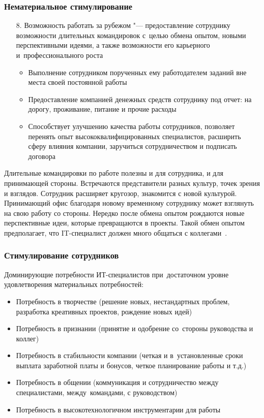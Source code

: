 \documentclass{../industrial-development}
\begin{document}
\begin{frame} \frametitle{Нематериальное стимулирование}
				  \begin{itemize}
					\item[8.] \alert{Возможность работать за рубежом} "--- предоставление сотруднику возможности длительных командировок с~целью обмена опытом, новыми перспективными идеями, а также возможности его карьерного и~профессионального роста
					
									  \begin{itemize}
          \item Выполнение сотрудником порученных ему работодателем заданий вне места своей постоянной работы 
          \item Предоставление компанией денежных средств сотруднику под отчет: на дорогу, проживание, питание и прочие расходы
					\item Способствует улучшению качества работы сотрудников, позволяет перенять опыт высококвалифицированных специалистов, расширить сферу влияния компании, заручиться сотрудничеством и подписать договора

  \end{itemize}
  \end{itemize}
		\end{frame}
		
		\lecturenotes
		
Длительные командировки по работе полезны и для сотрудника, и для принимающей стороны. Встречаются представители разных культур, точек зрения и взглядов. Сотрудник расширяет кругозор, знакомится с новой культурой. Принимающий офис благодаря новому временному сотруднику может взглянуть на свою работу со стороны. Нередко после обмена опытом рождаются новые перспективные идеи, которые превращаются в проекты. Такой обмен опытом предполагает, что IT-специалист должен много общаться с коллегами~\cite{VchemosobenIT}.

\begin{frame} \frametitle{Стимулирование сотрудников}
				  Доминирующие потребности ИТ-специалистов при~достаточном уровне удовлетворения материальных потребностей:
					\begin{itemize}
					
\item Потребность в творчестве (решение новых, нестандартных проблем, разработка креативных проектов, рождение новых идей)
\item Потребность в признании (принятие и одобрение со~стороны руководства и коллег)
\item Потребность в стабильности компании (четкая и в~установленные сроки выплата заработной платы и бонусов, четкое планирование работы и т.д.)
\item Потребность в общении (коммуникация и
сотрудничество между специалистами, между~командами, с руководством)
\item Потребность в высокотехнологичном инструментарии для работы
\end{itemize}
\end{frame}
\end{document}
